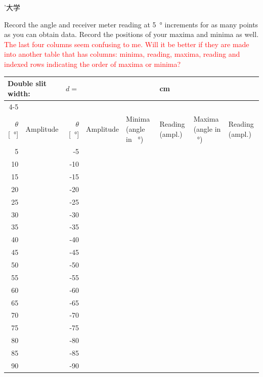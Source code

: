 ’大学\documentclass[addpoints]{physlabs}
\begin{document}
\begin{postlab}
    \question[1] Record the angle and receiver meter reading at \qty{5}{\degree} increments for as many points as you can obtain data. Record the positions of your maxima and minima as well.
    \textcolor{red}{The last four columns seem confusing to me. Will it be better if they are made into another table that has columns: minima, reading, maxima, reading and indexed rows indicating the order of maxima or minima?}
    \begin{center}
        \renewcommand{\arraystretch}{2}
        \captionsetup{font=normalsize}
        \begin{tabular}{|r|c|r|c|>{\centering\arraybackslash}p{2cm}|>{\centering\arraybackslash}p{1.5cm}|>{\centering\arraybackslash}p{2cm}|>{\centering\arraybackslash}p{1.5cm}|}
            \multicolumn{2}{l}{Double slit width:} & \multicolumn{1}{c}{$d=$} &\multicolumn{2}{c}{} & \multicolumn{3}{l}{cm}
            \\
            \cline{4-5}
            \multicolumn{6}{c}{}
            \\
            \hline
            \rowcolor{gray!20}
            $\theta$ [\qty{}{\degree}] & Amplitude & $\theta$ [\qty{}{\degree}] & Amplitude & Minima (angle in \qty{}{\degree}) & Reading (ampl.) & Maxima (angle in \qty{}{\degree}) & Reading (ampl.)
            \\ \hline
             5 & &  -5 & & & & &
            \\ \hline
            10 & & -10 & & & & &
            \\ \hline
            15 & & -15 & & & & &
            \\ \hline
            20 & & -20 & & & & &
            \\ \hline
            25 & & -25 & & & & &
            \\ \hline
            30 & & -30 & & & & &
            \\ \hline
            35 & & -35 & & & & &
            \\ \hline
            40 & & -40 & & & & &
            \\ \hline
            45 & & -45 & & & & &
            \\ \hline
            50 & & -50 & & & & &
            \\ \hline
            55 & & -55 & & & & &
            \\ \hline
            60 & & -60 & & & & &
            \\ \hline
            65 & & -65 & & & & &
            \\ \hline
            70 & & -70 & & & & &
            \\ \hline
            75 & & -75 & & & & &
            \\ \hline
            80 & & -80 & & & & &
            \\ \hline
            85 & & -85 & & & & &
            \\ \hline
            90 & & -90 & & & & &
            \\ \hline
        \end{tabular}
    \end{center}


\end{postlab}
\end{document}
